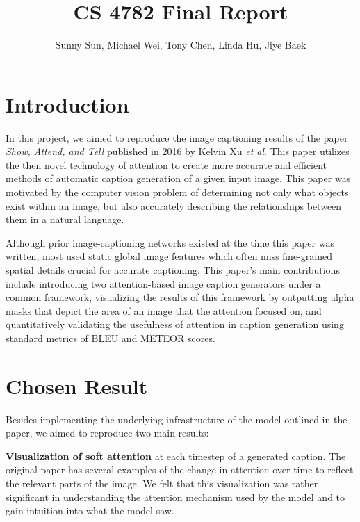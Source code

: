 \documentclass{article}
\title{\vspace{0cm}\myfont CS 4782 Final Report}
\author{Sunny Sun, Michael Wei, Tony Chen, Linda Hu, Jiye Baek}
\begin{document}
\maketitle

\section{Introduction}


In this project, we aimed to reproduce the image captioning results of the paper \textit{Show, Attend, and Tell} published in 2016 by Kelvin Xu \textit{et al}. This paper utilizes the then novel technology of attention to create more accurate and efficient methods of automatic caption generation of a given input image. This paper was motivated by the computer vision problem of determining not only what objects exist within an image, but also accurately describing the relationships between them in a natural language.

Although prior image-captioning networks existed at the time this paper was written, most used static global image features which often miss fine-grained spatial details crucial for accurate captioning. This paper's main contributions include introducing two attention-based image caption generators under a common framework, visualizing the results of this framework by outputting alpha masks that depict the area of an image that the attention focused on, and quantitatively validating the usefulness of attention in caption generation using standard metrics of BLEU and METEOR scores.

\section{Chosen Result}


Besides implementing the underlying infrastructure of the model outlined in the paper, we aimed to reproduce two main results:

\textbf{Visualization of soft attention} at each timestep of a generated caption. The original paper has several examples of the change in attention over time to reflect the relevant parts of the image. We felt that this visualization was rather significant in understanding the attention mechanism used by the model and to gain intuition into what the model saw.
\end{document}

